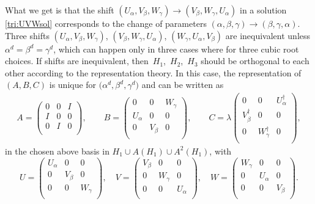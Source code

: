 \documentclass[11pt]{article}
\numberwithin{equation}{section}
\numberwithin{equation}{section}
\newcommand{\ea}[1]{\begin{align}#1\end{align}}
\newcommand{\bmp}{\begin{pmatrix}}
\newcommand{\emp}{\end{pmatrix}}
\begin{document}
What we get is that the shift
$(U_{\alpha}, V_{\beta},W_{\gamma}) \rightarrow (V_{\beta},W_{\gamma},U_{\alpha})$
in a solution \eqref{tri:UVWsol} corresponds to
the change of parameters
$({\alpha}, {\beta}, {\gamma}) \rightarrow ({\beta}, {\gamma}, {\alpha})$.
Three shifts $(U_{\alpha}, V_{\beta},W_{\gamma})$, $(V_{\beta},W_{\gamma},U_{\alpha})$,
$(W_{\gamma},U_{\alpha},V_{\beta})$ are inequivalent unless
$\alpha^d = \beta^d = \gamma^d$, which can happen only in three cases
where  for three cubic root choices.
If shifts are inequivalent, then~$H_1$,~$H_2$,~$H_3$ should be orthogonal to each other
according to the representation theory.
In this case, the representation of $(A,B,C)$ is unique for
$\bigl({\alpha^d}, {\beta^d}, {\gamma^d}\bigr)$ and can be written as
\ea{\label{tri:abcsol}
A = \bmp
0 & 0 & I \\
I & 0 & 0 \\
0 & I & 0 \\
\emp,
\qquad
B = \bmp
0 & 0 & W_\gamma \\
U_\alpha & 0 & 0 \\
0 & V_\beta & 0 \\
\emp,
\qquad
C = \lambda\bmp
0 & 0 & U^\dag_{\alpha} \\
V^\dag_{\beta} & 0 & 0 \\
0 & W^\dag_{\gamma} & 0 \\
\emp,
}
in the chosen above basis in $H_1 \cup A(H_1) \cup A^2(H_1)$, with
\[
 U = \bmp
 U_\alpha & 0 & 0 \\
 0 & V_\beta & 0 \\
 0 & 0 & W_\gamma \\
 \emp,
 \quad
 V = \bmp
 V_\beta & 0 & 0 \\
 0 & W_\gamma & 0 \\
 0 & 0 & U_\alpha \\
 \emp,
 \quad
 W = \bmp
 W_\gamma & 0 & 0 \\
 0 & U_\alpha & 0 \\
 0 & 0 & V_\beta \\
 \emp.
\]
\end{document}
